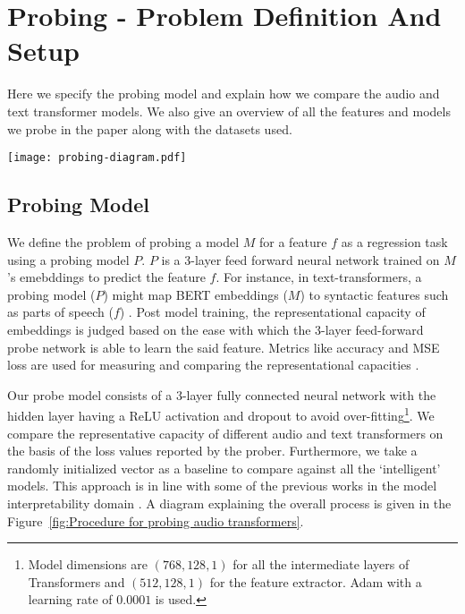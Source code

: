 \documentclass[sigconf]{acmart}
\begin{document}

\section{Probing - Problem Definition And Setup}
\label{sec:Probing - Problem Definition And Setup}
Here we specify the probing model and explain how we compare the audio and text transformer models. We also give an overview of all the features and models we probe in the paper along with the datasets used.
    
\begin{figure*}
  \texttt{[image: probing-diagram.pdf]}
  \caption{\label{fig:Procedure for probing audio transformers}Procedure for probing audio transformers}
\end{figure*}

\subsection{Probing Model}
\label{sec:Probing Model}
We define the problem of probing a model $M$ for a feature $f$ as a regression task using a probing model $P$. $P$ is a 3-layer feed forward neural network trained on $M$'s emebddings to predict the feature $f$. For instance, in text-transformers, a probing model ($P$) might map BERT embeddings ($M$) to syntactic features such as parts of speech ($f$) \cite{jawahar-etal-2019-bert}. Post model training, the representational capacity of embeddings is judged based on the ease with which the 3-layer feed-forward probe network is able to learn the said feature. Metrics like accuracy and MSE loss are used for measuring and comparing the representational capacities \cite{alishahi2017encoding,belinkov2017analyzing,prasad2020accents,belinkov2017neural,jawahar-etal-2019-bert}.

Our probe model consists of a $3$-layer fully connected neural network with the hidden layer having a ReLU activation and dropout to avoid over-fitting\footnote{Model dimensions are $(768,128,1)$ for all the intermediate layers of Transformers and $(512,128,1)$ for the feature extractor. Adam with a learning rate of $0.0001$ is used.}. We compare the representative capacity of different audio and text transformers on the basis of the loss values reported by the prober. Furthermore, we take a randomly initialized vector as a baseline to compare against all the `intelligent' models. This approach is in line with some of the previous works in the model interpretability domain \cite{alishahi2017encoding,belinkov2017analyzing,prasad2020accents,belinkov2017neural,jawahar-etal-2019-bert}. A diagram explaining the overall process is given in the Figure~\ref{fig:Procedure for probing audio transformers}.
\end{document}
